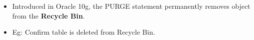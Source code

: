 
\begin{flushleft}

	\begin{itemize}
		\item Introduced in Oracle 10g, the PURGE statement permanently removes object from the \textbf{Recycle Bin}. 
		\bigskip
		\item Eg:
		Confirm table is deleted from Recycle Bin.
		\bigskip
		
	\end{itemize}	
	
\end{flushleft}
